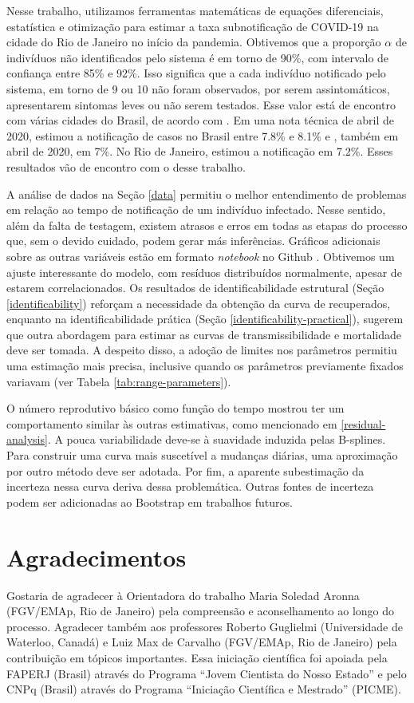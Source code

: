 Nesse trabalho, utilizamos ferramentas matemáticas de equações diferenciais,
estatística e otimização para estimar a taxa subnotificação de COVID-19 na
cidade do Rio de Janeiro no início da pandemia. Obtivemos que a proporção
$\alpha$ de indivíduos não identificados pelo sistema é em torno de 90\%, com
intervalo de confiança entre 85\% e 92\%. Isso significa que a cada indivíduo
notificado pelo sistema, em torno de 9 ou 10 não foram observados, por serem 
assintomáticos, apresentarem sintomas leves ou não serem testados. Esse valor
está de encontro com várias cidades do Brasil, de acordo com
\cite{subnotificacao-folha-de-sao-paulo}. Em uma nota técnica de abril de 2020,
\cite{subnotification-brazil} estimou a notificação de casos no Brasil entre
7.8\% e 8.1\% e \cite{subnotification2-brazil}, também em abril de 2020, em
7\%. No Rio de Janeiro, \cite{subnotification-rio} estimou a notificação em
7.2\%. Esses resultados vão de encontro com o desse trabalho. 

A análise de dados na Seção \ref{data} permitiu o melhor entendimento de
problemas em relação ao tempo de notificação de um indivíduo infectado. Nesse
sentido, além da falta de testagem, existem atrasos e erros em todas as etapas do
processo que, sem o devido cuidado, podem gerar más inferências.
Gráficos adicionais sobre as outras variáveis estão em formato {\it notebook}
no Github \cite{github}. Obtivemos um ajuste interessante do modelo, com
resíduos distribuídos normalmente, apesar de estarem correlacionados. Os
resultados de identificabilidade estrutural (Seção \ref{identificability}) reforçam a necessidade da obtenção
da curva de recuperados, enquanto na identificabilidade prática (Seção \ref{identificability-practical}),
sugerem que outra abordagem para estimar as curvas de transmissibilidade e
mortalidade deve ser tomada. A despeito disso, a adoção de limites nos parâmetros permitiu
uma estimação mais precisa, inclusive quando os parâmetros previamente fixados
variavam (ver Tabela \ref{tab:range-parameters}). 

O número reprodutivo básico como função do tempo mostrou ter um comportamento
similar às outras estimativas, como mencionado em \ref{residual-analysis}. A
pouca variabilidade deve-se à suavidade induzida pelas B-splines. Para
construir uma curva mais suscetível a mudanças diárias, uma aproximação por
outro método deve ser adotada. Por fim, a aparente subestimação da incerteza
nessa curva deriva dessa problemática. Outras fontes de incerteza podem ser
adicionadas ao Bootstrap em trabalhos futuros. 

\section{Agradecimentos}

Gostaria de agradecer à Orientadora do trabalho Maria Soledad Aronna
(FGV/EMAp, Rio de Janeiro) pela
compreensão e aconselhamento ao longo do processo. Agradecer também aos
professores Roberto Guglielmi (Universidade de Waterloo, Canadá) e Luiz Max de
Carvalho (FGV/EMAp, Rio de Janeiro) pela contribuição em
tópicos importantes. Essa iniciação científica foi apoiada pela FAPERJ
(Brasil) através do Programa ``Jovem Cientista do Nosso Estado'' e pelo CNPq
(Brasil) através do Programa ``Iniciação Científica e Mestrado'' (PICME). 